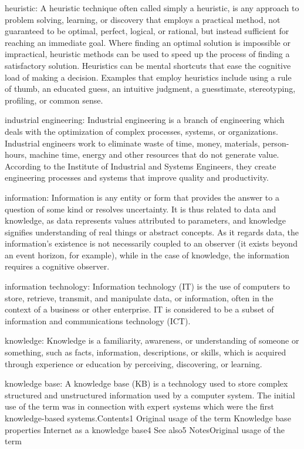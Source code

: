 \documentclass[]{book}
\begin{document}
heuristic: A heuristic technique often called simply a heuristic, is any
approach to problem solving, learning, or discovery that employs a
practical method, not guaranteed to be optimal, perfect, logical, or
rational, but instead sufficient for reaching an immediate goal. Where
finding an optimal solution is impossible or impractical, heuristic
methods can be used to speed up the process of finding a satisfactory
solution. Heuristics can be mental shortcuts that ease the cognitive
load of making a decision. Examples that employ heuristics include using
a rule of thumb, an educated guess, an intuitive judgment, a
guesstimate, stereotyping, profiling, or common sense.

industrial engineering: Industrial engineering is a branch of
engineering which deals with the optimization of complex processes,
systems, or organizations. Industrial engineers work to eliminate waste
of time, money, materials, person-hours, machine time, energy and other
resources that do not generate value. According to the Institute of
Industrial and Systems Engineers, they create engineering processes and
systems that improve quality and productivity.

information: Information is any entity or form that provides the answer
to a question of some kind or resolves uncertainty. It is thus related
to data and knowledge, as data represents values attributed to
parameters, and knowledge signifies understanding of real things or
abstract concepts. As it regards data, the information's existence is
not necessarily coupled to an observer (it exists beyond an event
horizon, for example), while in the case of knowledge, the information
requires a cognitive observer.

information technology: Information technology (IT) is the use of
computers to store, retrieve, transmit, and manipulate data, or
information, often in the context of a business or other enterprise. IT
is considered to be a subset of information and communications
technology (ICT).

knowledge: Knowledge is a familiarity, awareness, or understanding of
someone or something, such as facts, information, descriptions, or
skills, which is acquired through experience or education by perceiving,
discovering, or learning.

knowledge base: A knowledge base (KB) is a technology used to store
complex structured and unstructured information used by a computer
system. The initial use of the term was in connection with expert
systems which were the first knowledge-based systems.Contents1 Original
usage of the term Knowledge base properties Internet as a knowledge
base4 See also5 NotesOriginal usage of the term
\end{document}
